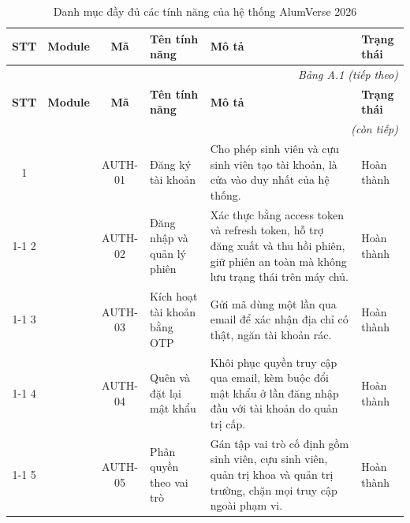 \documentclass[12pt,a4paper,oneside]{report}
\begin{document}
\begin{landscape}
\renewcommand{\arraystretch}{1.25}
\begin{longtable}{|c|>{\raggedright\arraybackslash}p{3.1cm}|c|>{\raggedright\arraybackslash}p{4.6cm}|>{\raggedright\arraybackslash}p{8.4cm}|>{\raggedright\arraybackslash}p{2.4cm}|}
\caption{Danh mục đầy đủ các tính năng của hệ thống AlumVerse 2026}\label{tab:appendixA}\\
\hline
\textbf{STT} & \textbf{Module} & \textbf{Mã} & \textbf{Tên tính năng} & \textbf{Mô tả} & \textbf{Trạng thái} \\ \hline
\endfirsthead
\multicolumn{6}{r}{\itshape\small Bảng A.1 (tiếp theo)}\\[2pt]
\hline
\textbf{STT} & \textbf{Module} & \textbf{Mã} & \textbf{Tên tính năng} & \textbf{Mô tả} & \textbf{Trạng thái} \\ \hline
\endhead
\hline \multicolumn{6}{r}{\itshape\small (còn tiếp)}\\
\endfoot
\hline
\endlastfoot
\cellcolor{oldrow}1 & \cellcolor{oldrow} & \cellcolor{oldrow}AUTH-01 & \cellcolor{oldrow}Đăng ký tài khoản & \cellcolor{oldrow}Cho phép sinh viên và cựu sinh viên tạo tài khoản, là cửa vào duy nhất của hệ thống. & \cellcolor{oldrow}Hoàn thành \\
\cline{1-1}\cline{3-6}
\cellcolor{oldrow}2 & \cellcolor{oldrow} & \cellcolor{oldrow}AUTH-02 & \cellcolor{oldrow}Đăng nhập và quản lý phiên & \cellcolor{oldrow}Xác thực bằng access token và refresh token, hỗ trợ đăng xuất và thu hồi phiên, giữ phiên an toàn mà không lưu trạng thái trên máy chủ. & \cellcolor{oldrow}Hoàn thành \\
\cline{1-1}\cline{3-6}
\cellcolor{oldrow}3 & \cellcolor{oldrow} & \cellcolor{oldrow}AUTH-03 & \cellcolor{oldrow}Kích hoạt tài khoản bằng OTP & \cellcolor{oldrow}Gửi mã dùng một lần qua email để xác nhận địa chỉ có thật, ngăn tài khoản rác. & \cellcolor{oldrow}Hoàn thành \\
\cline{1-1}\cline{3-6}
\cellcolor{oldrow}4 & \cellcolor{oldrow} & \cellcolor{oldrow}AUTH-04 & \cellcolor{oldrow}Quên và đặt lại mật khẩu & \cellcolor{oldrow}Khôi phục quyền truy cập qua email, kèm buộc đổi mật khẩu ở lần đăng nhập đầu với tài khoản do quản trị cấp. & \cellcolor{oldrow}Hoàn thành \\
\cline{1-1}\cline{3-6}
\cellcolor{oldrow}5 & \cellcolor{oldrow} & \cellcolor{oldrow}AUTH-05 & \cellcolor{oldrow}Phân quyền theo vai trò & \cellcolor{oldrow}Gán tập vai trò cố định gồm sinh viên, cựu sinh viên, quản trị khoa và quản trị trường, chặn mọi truy cập ngoài phạm vi. & \cellcolor{oldrow}Hoàn thành \\

\end{longtable}
\end{landscape}
\end{document}
